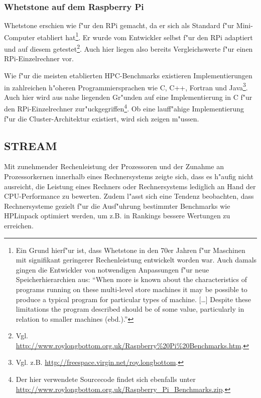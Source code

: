 \subsubsection{Whetstone auf dem Raspberry Pi}\label{Whetstone RPi}

Whetstone erschien wie f"ur den RPi gemacht, da er sich als Standard f"ur Mini-Computer etabliert hat\footnote{Ein Grund hierf"ur ist, dass Whetstone in den 70er Jahren f"ur Maschinen mit signifikant geringerer Rechenleistung entwickelt worden war. Auch damals gingen die Entwickler von notwendigen Anpassungen f"ur neue Speicherhierarchien aus: "`When more is known about the characteristics of programs running on these multi-level store machines it may be possible to produce a typical program for particular types of machine. [\dots] Despite these limitations the program described should be of some value, particularly in relation to smaller machines (ebd.)."'}. Er wurde vom Entwickler selbst f"ur den RPi adaptiert und auf diesem getestet\footnote{Vgl. \url{http://www.roylongbottom.org.uk/Raspberry\%20Pi\%20Benchmarks.htm}.}. Auch hier liegen also bereits Vergleichswerte f"ur einen RPi-Einzelrechner vor. 

Wie f"ur die meisten etablierten HPC-Benchmarks existieren Implementierungen in zahlreichen h"oheren Programmiersprachen wie C, C++, Fortran und Java\footnote{Vgl. z.B. \url{http://freespace.virgin.net/roy.longbottom}.}. Auch hier wird aus nahe liegenden Gr"unden auf eine Implementierung in C f"ur den RPi-Einzelrechner zur"uckgegriffen\footnote{Der hier verwendete Sourcecode findet sich ebenfalls unter \url{http://www.roylongbottom.org.uk/Raspberry_Pi_Benchmarks.zip}.}. Ob eine lauff"ahige Implementierung f"ur die Cluster-Architektur existiert, wird sich zeigen m"ussen. 

\subsection{STREAM}\label{STREAM}

Mit zunehmender Rechenleistung der Prozessoren und der Zunahme an Prozessorkernen innerhalb eines Rechnersystems zeigte sich, dass es h"aufig nicht ausreicht, die Leistung eines Rechners oder Rechnersystems lediglich an Hand der CPU-Performance zu bewerten. Zudem l"asst sich eine Tendenz beobachten, dass Rechnersysteme gezielt f"ur die Ausf"uhrung bestimmter Benchmarks wie HPLinpack optimiert werden, um z.B. in Rankings bessere Wertungen zu erreichen. 

